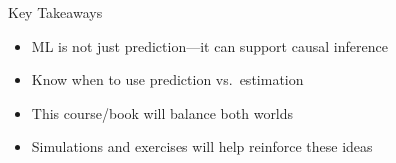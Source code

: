 \documentclass[
  ignorenonframetext,
]{beamer}
\providecommand{\tightlist}{%
  \setlength{\itemsep}{0pt}\setlength{\parskip}{0pt}}
\begin{document}
\begin{frame}{Key Takeaways}
\protect\hypertarget{key-takeaways}{}
\begin{itemize}
\tightlist
\item
  ML is not just prediction---it can support causal inference
\item
  Know when to use prediction vs.~estimation
\item
  This course/book will balance both worlds
\item
  Simulations and exercises will help reinforce these ideas
\end{itemize}

\end{frame}
\end{document}
